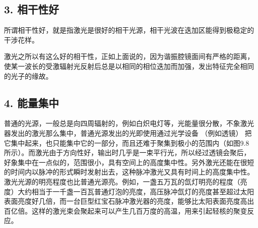 \subsection{3. 相干性好}

所谓相干性好，就是指激光是很好的相干光源，相干光波在迭加区能得到极稳定的干涉花样。

激光之所以有这么好的相干性，正如上面说的，因为谐振腔镜面间有严格的距离，使某一波长的受激辐射光反射后总是以相同的相位迭加而加强，发出特征完全相同的光子的缘故。

\subsection{4. 能量集中}

普通的光源，一般总是向四周辐射的，例如白炽电灯等，光能量很分散，不象激光器发出的激光那么集中，普通光源发出的光即使用通过光学设备
（例如透镜）
把它集中起来，也只能集中它的一部分，而且还难于聚集到极小的范围内（如图9.8所示）。而激光由于方向性好，输出时几乎是一束平行光，所以经过透镜会聚后，好象集中在一点似的，范围很小，具有空间上的高度集中性。另外激光还能在很短的时间内以脉冲的形式瞬时发射出去，这种脉冲激光又具有时间上的高度集中性。激光光源的明亮程度也比普通光源亮。例如，一盏五万瓦的氙灯明亮的程度（亮度）大约相当于一千盏一百瓦普通灯泡的亮度，高压脉冲氙灯的亮度甚至超过太阳表面亮度好几倍，而一台巨型红宝石脉冲激光器的亮度，能够比太阳表面亮度高出百亿倍。这样的激光束会聚起来可以产生几百万度的高温，用来引起轻核的聚变反应。

